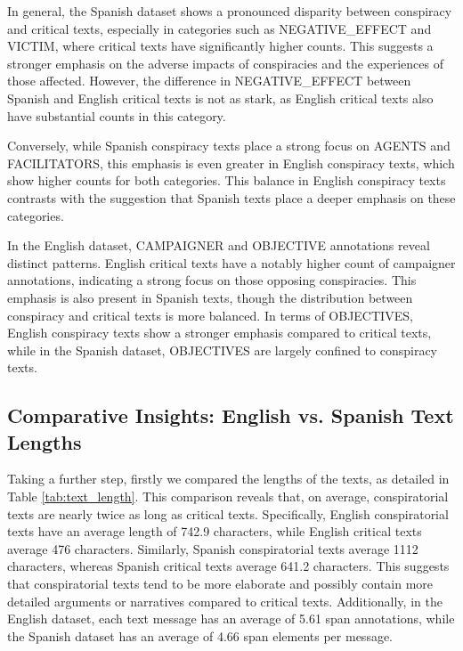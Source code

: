 \documentclass{Configuration_Files/PoliMi3i_thesis}
\begin{document}
In general, the Spanish dataset shows a pronounced disparity between conspiracy and critical texts, especially in categories such as NEGATIVE\_EFFECT and VICTIM, where critical texts have significantly higher counts. This suggests a stronger emphasis on the adverse impacts of conspiracies and the experiences of those affected. 
However, the difference in NEGATIVE\_EFFECT between Spanish and English critical texts is not as stark, as English critical texts also have substantial counts in this category.

Conversely, while Spanish conspiracy texts place a strong focus on AGENTS and FACILITATORS, this emphasis is even greater in English conspiracy texts, which show higher counts for both categories. This balance in English conspiracy texts contrasts with the suggestion that Spanish texts place a deeper emphasis on these categories.

In the English dataset, CAMPAIGNER and OBJECTIVE annotations reveal distinct patterns. English critical texts have a notably higher count of campaigner annotations, indicating a strong focus on those opposing conspiracies. This emphasis is also present in Spanish texts, though the distribution between conspiracy and critical texts is more balanced. In terms of OBJECTIVES, English conspiracy texts show a stronger emphasis compared to critical texts, while in the Spanish dataset, OBJECTIVES are largely confined to conspiracy texts. %

\subsection{Comparative Insights: English vs. Spanish Text Lengths} \label{subsec:comparative_insights_en_es_text_length}
Taking a further step, firstly we compared the lengths of the texts, as detailed in Table \ref{tab:text_length}. This comparison reveals that, on average, conspiratorial texts are nearly twice as long as critical texts. Specifically, English conspiratorial texts have an average length of 742.9 characters, while English critical texts average 476 characters. Similarly, Spanish conspiratorial texts average 1112 characters, whereas Spanish critical texts average 641.2 characters. This suggests that conspiratorial texts tend to be more elaborate and possibly contain more detailed arguments or narratives compared to critical texts. Additionally, in the English dataset, each text message has an average of 5.61 span annotations, while the Spanish dataset has an average of 4.66 span elements per message.
\end{document}
